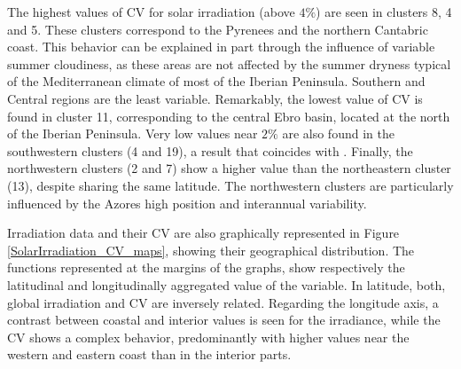 The highest values of CV for solar irradiation (above $4\%$) are seen in clusters 8, 4 and 5. These clusters correspond to the Pyrenees and the northern Cantabric coast. This behavior can be explained in part through the influence of variable summer cloudiness, as these areas are not affected by the summer dryness typical of the Mediterranean climate of most of the Iberian Peninsula. Southern and Central regions are the least variable. Remarkably, the lowest value of CV is found in cluster 11, corresponding to the central Ebro basin, located at the north of the Iberian Peninsula. Very low values near $2\%$   are also found in the southwestern clusters (4 and 19), a result that coincides with \cite{Gil2015}. Finally, the northwestern clusters (2 and 7) show a higher value than the northeastern cluster (13), despite sharing the same latitude. The northwestern clusters are particularly influenced by the Azores high position and interannual variability.

Irradiation data and their CV are also graphically represented in Figure \ref{SolarIrradiation_CV_maps}, showing their geographical distribution. The functions represented at the margins of the graphs, show respectively the latitudinal and longitudinally aggregated value of the variable. In latitude, both, global irradiation and CV are inversely related. Regarding the longitude axis, a contrast between coastal and interior values is seen for the irradiance, while the CV shows a complex behavior, predominantly with higher values near the western and eastern coast than in the interior parts.

